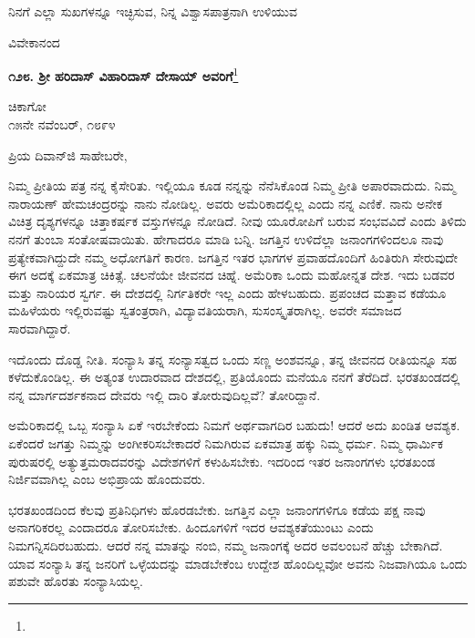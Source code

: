 \vspace{0.1cm}

ನಿನಗೆ ಎಲ್ಲಾ ಸುಖಗಳನ್ನೂ ಇಚ್ಛಿಸುವ, ನಿನ್ನ ವಿಶ್ವಾಸಪಾತ್ರನಾಗಿ ಉಳಿಯುವ

{\flushright
ವಿವೇಕಾನಂದ\par}

\eject

\begin{center}
\textbf{೧೨೮. ಶ‍್ರೀ ಹರಿದಾಸ್ ವಿಹಾರಿದಾಸ್ ದೇಸಾಯ್ ಅವರಿಗೆ}\footnote{}
\end{center}

\begin{flushright}
ಚಿಕಾಗೋ\\೧೫ನೇ ನವೆಂಬರ್, ೧೮೯೪
\end{flushright}

\noindent
ಪ್ರಿಯ ದಿವಾನ್‌ಜಿ ಸಾಹೇಬರೇ,

ನಿಮ್ಮ ಪ್ರೀತಿಯ ಪತ್ರ ನನ್ನ ಕೈಸೇರಿತು. ಇಲ್ಲಿಯೂ ಕೂಡ ನನ್ನನ್ನು ನೆನೆಸಿಕೊಂಡ ನಿಮ್ಮ ಪ್ರೀತಿ ಅಪಾರವಾದುದು. ನಿಮ್ಮ ನಾರಾಯಣ್ ಹೇಮಚಂದ್ರರನ್ನು ನಾನು ನೋಡಿಲ್ಲ. ಅವರು ಅಮೆರಿಕಾದಲ್ಲಿಲ್ಲ ಎಂದು ನನ್ನ ಎಣಿಕೆ. ನಾನು ಅನೇಕ ವಿಚಿತ್ರ ದೃಶ್ಯಗಳನ್ನೂ ಚಿತ್ತಾಕರ್ಷಕ ವಸ್ತುಗಳನ್ನೂ ನೋಡಿದೆ. ನೀವು ಯೂರೋಪಿಗೆ ಬರುವ ಸಂಭವವಿದೆ ಎಂದು ತಿಳಿದು ನನಗೆ ತುಂಬಾ ಸಂತೋಷವಾಯಿತು. ಹೇಗಾದರೂ ಮಾಡಿ ಬನ್ನಿ. ಜಗತ್ತಿನ ಉಳಿದೆಲ್ಲಾ ಜನಾಂಗಗಳಿಂದಲೂ ನಾವು ಪ್ರತ್ಯೇಕವಾಗಿದ್ದುದೇ ನಮ್ಮ ಅಧೋಗತಿಗೆ ಕಾರಣ. ಜಗತ್ತಿನ ಇತರ ಭಾಗಗಳ ಪ್ರವಾಹದೊಂದಿಗೆ ಹಿಂತಿರುಗಿ ಸೇರುವುದೇ ಈಗ ಅದಕ್ಕೆ ಏಕಮಾತ್ರ ಚಿಕಿತ್ಸೆ. ಚಲನೆಯೇ ಜೀವನದ ಚಿಹ್ನೆ. ಅಮೆರಿಕಾ ಒಂದು ಮಹೋನ್ನತ ದೇಶ. ಇದು ಬಡವರ ಮತ್ತು ನಾರಿಯರ ಸ್ವರ್ಗ. ಈ ದೇಶದಲ್ಲಿ ನಿರ್ಗತಿಕರೇ ಇಲ್ಲ ಎಂದು ಹೇಳಬಹುದು. ಪ್ರಪಂಚದ ಮತ್ತಾವ ಕಡೆಯೂ ಮಹಿಳೆಯರು ಇಲ್ಲಿರುವಷ್ಟು ಸ್ವತಂತ್ರರಾಗಿ, ವಿದ್ಯಾವತಿಯರಾಗಿ, ಸುಸಂಸ್ಕೃತರಾಗಿಲ್ಲ. ಅವರೇ ಸಮಾಜದ ಸಾರವಾಗಿದ್ದಾರೆ.

ಇದೊಂದು ದೊಡ್ಡ ನೀತಿ. ಸಂನ್ಯಾಸಿ ತನ್ನ ಸಂನ್ಯಾಸತ್ವದ ಒಂದು ಸಣ್ಣ ಅಂಶವನ್ನೂ, ತನ್ನ ಜೀವನದ ರೀತಿಯನ್ನೂ ಸಹ ಕಳೆದುಕೊಂಡಿಲ್ಲ. ಈ ಅತ್ಯಂತ ಉದಾರವಾದ ದೇಶದಲ್ಲಿ, ಪ್ರತಿಯೊಂದು ಮನೆಯೂ ನನಗೆ ತೆರೆದಿದೆ. ಭರತಖಂಡದಲ್ಲಿ ನನ್ನ ಮಾರ್ಗದರ್ಶಕನಾದ ದೇವರು ಇಲ್ಲಿ ದಾರಿ ತೋರುವುದಿಲ್ಲವೆ? ತೋರಿದ್ದಾನೆ.

ಅಮೆರಿಕಾದಲ್ಲಿ ಒಬ್ಬ ಸಂನ್ಯಾಸಿ ಏಕೆ ಇರಬೇಕೆಂದು ನಿಮಗೆ ಅರ್ಥವಾಗದಿರ ಬಹುದು! ಆದರೆ ಅದು ಖಂಡಿತ ಆವಶ್ಯಕ. ಏಕೆಂದರೆ ಜಗತ್ತು ನಿಮ್ಮನ್ನು ಅಂಗೀಕರಿಸಬೇಕಾದರೆ ನಿಮಗಿರುವ ಏಕಮಾತ್ರ ಹಕ್ಕು ನಿಮ್ಮ ಧರ್ಮ. ನಿಮ್ಮ ಧಾರ್ಮಿಕ ಪುರುಷರಲ್ಲಿ ಅತ್ಯುತ್ತಮರಾದವರನ್ನು ವಿದೇಶಗಳಿಗೆ ಕಳುಹಿಸಬೇಕು. ಇದರಿಂದ ಇತರ ಜನಾಂಗಗಳು ಭರತಖಂಡ ನಿರ್ಜಿವವಾಗಿಲ್ಲ ಎಂಬ ಅಭಿಪ್ರಾಯ ಹೊಂದುವರು.

ಭರತಖಂಡದಿಂದ ಕೆಲವು ಪ್ರತಿನಿಧಿಗಳು ಹೊರಡಬೇಕು. ಜಗತ್ತಿನ ಎಲ್ಲಾ ಜನಾಂಗಗಳಿಗೂ ಕಡೆಯ ಪಕ್ಷ ನಾವು ಅನಾಗರಿಕರಲ್ಲ ಎಂದಾದರೂ ತೋರಿಸಬೇಕು. ಹಿಂದೂಗಳಿಗೆ ಇದರ ಆವಶ್ಯಕತೆಯುಂಟು ಎಂದು ನಿಮಗನ್ನಿಸದಿರಬಹುದು. ಆದರೆ ನನ್ನ ಮಾತನ್ನು ನಂಬಿ, ನಮ್ಮ ಜನಾಂಗಕ್ಕೆ ಅದರ ಅವಲಂಬನೆ ಹೆಚ್ಚು ಬೇಕಾಗಿದೆ. ಯಾವ ಸಂನ್ಯಾಸಿ ತನ್ನ ಜನರಿಗೆ ಒಳ್ಳೆಯದನ್ನು ಮಾಡಬೇಕೆಂಬ ಉದ್ದೇಶ ಹೊಂದಿಲ್ಲವೋ ಅವನು ನಿಜವಾಗಿಯೂ ಒಂದು ಪಶುವೇ ಹೊರತು ಸಂನ್ಯಾಸಿಯಲ್ಲ.

